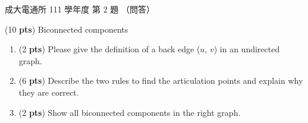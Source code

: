 \begin{pastexam}[label={px:ncku-111-cce-ds-02}]{成大電通所 111 學年度 第 2 題}
（問答）

(10 \textbf{pts}) Biconnected components
\begin{enumerate}[label=\alph*.]
\item (2 \textbf{pts}) Please give the definition of a back edge ($u$, $v$) in an undirected
graph.
\item (6 \textbf{pts}) Describe the two rules to find the articulation points and explain why
they are correct.
\item (2 \textbf{pts}) Show all biconnected components in the right graph.
\end{enumerate}
\begin{center}
\end{center}
\end{pastexam}

